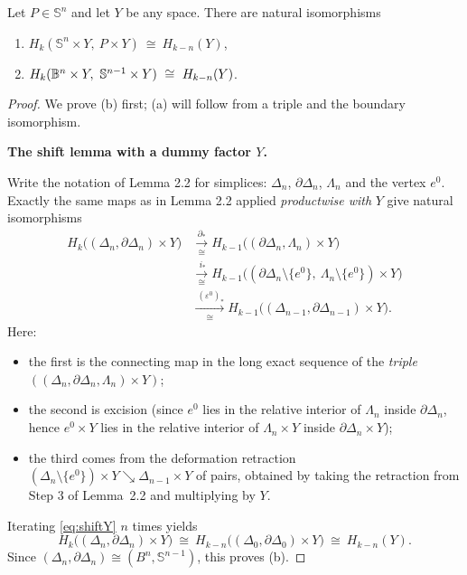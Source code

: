 \begin{proposition}\label{prop:2.16}
Let $P\in \mathbb{S}^n$ and let $Y$ be any space. There are natural isomorphisms
\begin{enumerate}
\item $H_k(\mathbb{S}^n\times Y,\ P\times Y)\ \cong\ H_{k-n}(Y)$,
\item $H_k(\B^n\times Y,\ \mathbb{S}^{n-1}\times Y)\ \cong\ H_{k-n}(Y)$.
\end{enumerate}
\end{proposition}

\begin{proof}
We prove (b) first; (a) will follow from a triple and the boundary isomorphism.

\smallskip
\textbf{The shift lemma with a dummy factor $Y$.}

Write the notation of Lemma 2.2 for simplices: $\Delta_n$, $\partial \Delta_n$,
$\Lambda_n$ and the vertex $e^0$.
Exactly the same maps as in Lemma 2.2 applied \emph{productwise with} $Y$ give
natural isomorphisms
\begin{equation}\label{eq:shiftY}
\begin{aligned}
H_k\big((\Delta_n,\partial \Delta_n)\times Y\big)
&\xrightarrow[\cong]{\ \partial_*\ } H_{k-1}\big((\partial \Delta_n,\Lambda_n)\times Y\big)\\
&\xrightarrow[\cong]{\ i_* }
H_{k-1}\big((\partial \Delta_n\setminus\{e^0\},\ \Lambda_n\setminus\{e^0\})\times Y\big)\\
&\xrightarrow[\cong]{\ (\varepsilon^0)_* }
H_{k-1}\big((\Delta_{n-1},\partial \Delta_{n-1})\times Y\big).
\end{aligned}
\end{equation}
Here:
\begin{itemize}
\item the first is the connecting map in the long exact sequence of the \emph{triple}
$((\Delta_n,\partial \Delta_n,\Lambda_n)\times Y)$;
\item the second is excision (since $e^0$ lies in the relative interior of $\Lambda_n$
inside $\partial \Delta_n$, hence $e^0\times Y$ lies in the relative interior of
$\Lambda_n\times Y$ inside $\partial \Delta_n\times Y$);
\item the third comes from the deformation retraction
$(\Delta_n\setminus\{e^0\})\times Y \searrow \Delta_{n-1}\times Y$
of pairs, obtained by taking the retraction from Step 3 of Lemma~2.2 and multiplying by $Y$.
\end{itemize}
Iterating \eqref{eq:shiftY} $n$ times yields
\[
H_k\big((\Delta_n,\partial \Delta_n)\times Y\big)\ \cong\
H_{k-n}\big((\Delta_0,\partial \Delta_0)\times Y\big)
\ \cong\ H_{k-n}(Y).
\]
Since $(\Delta_n,\partial \Delta_n)\cong(B^n,\mathbb{S}^{n-1})$, this proves (b).


\end{proof}
